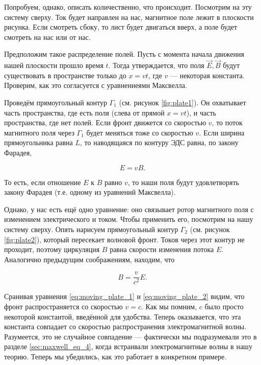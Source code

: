 \documentclass[a4paper,12pt]{article}
\numberwithin{equation}{section}
\begin{document}
Попробуем, однако, описать количественно, что происходит. Посмотрим на
эту систему сверху. Ток будет направлен на нас, магнитное поле лежит
в плоскости рисунка. Если смотреть сбоку, то лист будет двигаться
вверх, а поле будет смотреть на нас или от нас. 

Предположим такое распределение полей. Пусть с момента начала движения
нашей плоскости прошло время $t$. Тогда утверждается, что поля
$\vec{E}, \vec{B}$ будут существовать в пространстве только до
$x=vt$, где $v$ --- некоторая константа. Проверим, как это согласуется с
уравнениеями Максвелла. 

Проведём прямоугольный контур $\Gamma_1$ (см. рисунок \ref{fig:plate1}). Он
охватывает часть пространства, где есть поля (слева от прямой $x=vt$),
и часть пространства, где нет полей. Если фронт движется со скоростью
$v$, то поток магнитного поля через $\Gamma_1$ будет меняться тоже со
скоростью $v$. Если ширина прямоугольника равна $L$, то наводящаяся по
контуру ЭДС равна, по закону Фарадея,

\begin{equation}
  \label{eq:moving_plate_1}
  E = v B.
\end{equation}

То есть, если отношение $E$ к $B$ равно $v$, то наши поля будут
удовлетворять закону Фарадея (т.е. одному из уравнений Максвелла). 

Однако, у нас есть ещё одно уравнение: оно связывает ротор магнитного
поля с изменением электрического и током. Чтобы применить его,
посмотрим на нашу систему сверху. Опять нарисуем прямоугольный контур
$\Gamma_2$ (см. рисунок \ref{fig:plate2}), который пересекает волновой
фронт. Токов через этот контур не проходит, поэтому циркуляция $B$
равна скорости изменения потока $E$. Аналогично предыдущим
соображениям, находим, что

\begin{equation}
  \label{eq:moving_plate_2}
  B = \frac{v}{c^2} E.
\end{equation}

Сранивая уравнения \eqref{eq:moving_plate_1} и
\eqref{eq:moving_plate_2} видим, что фронт распространяется со
скоростью $v=c$. Как мы помним, $c$ было просто некоторой константой,
введённой для удобства. Теперь оказывается, что эта константа
совпадает со скоростью распространения электромагнитной
волны. Разумеется, это не случайное совпадение --- фактически мы
подразумевали это в разделе \ref{sec:maxwell_eq_4}, когда встраивали
электромагнитные волны в нашу теорию. Теперь мы убедились, как это
работает в конкретном примере. 
\end{document}
